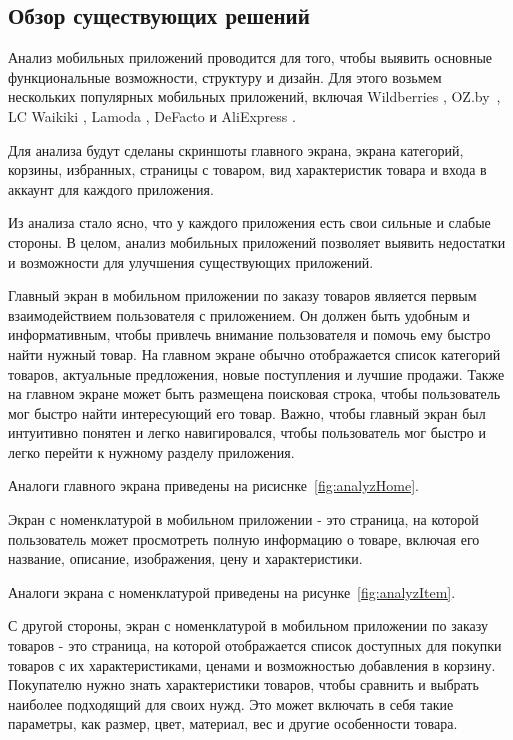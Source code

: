 \subsection{Обзор существующих решений}

Анализ мобильных приложений проводится для того, чтобы выявить основные функциональные возможности, структуру и дизайн.
Для этого возьмем нескольких популярных мобильных приложений, включая
Wildberries \cite{AndroidWildberries},
OZ.by~\cite{AndroidOzBy},
LC Waikiki \cite{AndroidLcWaikiki},
Lamoda \cite{AndroidLamoda},
DeFacto \cite{AndroidDefacto}
и AliExpress \cite{AndroidAliExpress}.

Для анализа будут сделаны скриншоты главного экрана, экрана категорий, корзины, избранных, страницы с товаром, вид характеристик товара и входа в аккаунт
для каждого приложения.

Из анализа стало ясно, что у каждого приложения есть свои сильные и слабые стороны.
В целом, анализ мобильных приложений позволяет выявить недостатки и возможности для улучшения существующих приложений.

Главный экран в мобильном приложении по заказу товаров является первым взаимодействием пользователя с приложением.
Он должен быть удобным и информативным, чтобы привлечь внимание пользователя и помочь ему быстро найти нужный товар.
На главном экране обычно отображается список категорий товаров, актуальные предложения, новые поступления и лучшие продажи.
Также на главном экране может быть размещена поисковая строка, чтобы пользователь мог быстро найти интересующий его товар.
Важно, чтобы главный экран был интуитивно понятен и легко навигировался, чтобы пользователь мог быстро и легко перейти к нужному разделу приложения.

Аналоги главного экрана приведены на рисиснке~\ref{fig:analyzHome}.

Экран с номенклатурой в мобильном приложении - это страница, на которой пользователь может просмотреть полную информацию о товаре,
включая его название, описание, изображения, цену и характеристики.

Аналоги экрана с номенклатурой приведены на рисунке~\ref{fig:analyzItem}.

С другой стороны, экран с номенклатурой в мобильном приложении по заказу товаров - это страница,
на которой отображается список доступных для покупки товаров с их характеристиками,
ценами и возможностью добавления в корзину.
Покупателю нужно знать характеристики товаров,
чтобы сравнить и выбрать наиболее подходящий для своих нужд.
Это может включать в себя такие параметры, как размер, цвет, материал, вес и другие особенности товара.

